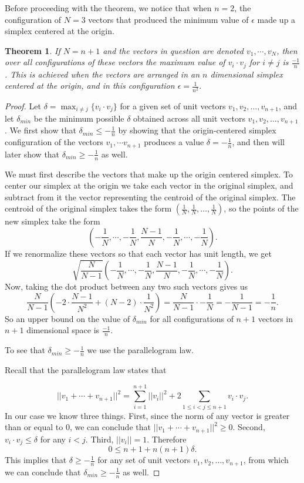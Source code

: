 \documentclass[11pt,letterpaper,twoside,english]{article}
\theoremstyle{theorem}
\newtheorem{theorem}{Theorem}[section]
\theoremstyle{remark}
\begin{document}
Before proceeding with the theorem, we notice that when $n=2$, the configuration of $N=3$ vectors that produced the minimum value of $\epsilon$ made up a simplex centered at the origin. 


\begin{theorem}
If $N=n+1$ and the vectors in question are denoted $v_1,\cdots, v_N$, then over all configurations of these vectors the maximum value of $v_i\cdot v_j$ for $i\neq j$ is $\frac{-1}{n}$. This is achieved when the vectors are arranged in an $n$ dimensional simplex centered at the origin, and in this configuration $\epsilon=\frac{1}{n^2}$.  
\end{theorem}

\begin{proof}
Let $\delta= \max_{i\neq j}\{v_i\cdot v_j\}$ for a given set of unit vectors $v_1, v_2, \ldots, v_{n+1}$, and let $\delta_{min}$ be the minimum possible $\delta$ obtained across all unit vectors $v_1, v_2, \ldots, v_{n+1}$. We first show that $\delta_{min} \le-\frac{1}{n}$ by showing that the origin-centered simplex configuration of the vectors $v_1,\cdots v_{n+1}$ produces a value $\delta=-\frac{1}{n}$, and then will later show that $\delta_{min} \geq -\frac{1}{n}$ as well. 

We must first describe the vectors that make up the origin centered simplex. To center our simplex at the origin we take each vector in the original simplex, and subtract from it the vector representing the centroid of the original simplex. The centroid of the original simplex takes the form $(\frac{1}{N},\frac{1}{N},\ldots,\frac{1}{N})$, so the points of the new simplex take the form
$$
\left(-\frac{1}{N},\cdots,-\frac{1}{N},\frac{N-1}{N},-\frac{1}{N},\cdots,-\frac{1}{N}\right).
$$
If we renormalize these vectors so that each vector has unit length, we get 
$$
\sqrt{\frac{N}{N-1}}\left(-\frac{1}{N},\cdots,-\frac{1}{N},\frac{N-1}{N},-\frac{1}{N},\cdots,-\frac{1}{N}\right).
$$
Now, taking the dot product between any two such vectors gives us
$$
\frac{N}{N-1}\left(-2\cdot\frac{N-1}{N^2}+(N-2)\cdot\frac{1}{N^2}\right)=\frac{N}{N-1}\cdot-\frac{1}{N}=-\frac{1}{N-1}=-\frac{1}{n}.
$$
So an upper bound on the value of $\delta_{min}$ for all configurations of $n+1$ vectors in $n+1$ dimensional space is $\frac{-1}{n}$. 

To see that $\delta_{min} \ge-\frac{1}{n}$ we use the parallelogram law.

Recall that the parallelogram law states that 

$$
||v_1+\cdots+v_{n+1}||^2=\displaystyle\sum_{i=1}^{n+1}||v_i||^2+2\displaystyle\sum_{1\le i<j\le n+1}v_i\cdot v_j.
$$
In our case we know three things. First, since the norm of any vector is greater than or equal to $0$, we can conclude that $||v_1 + \cdots + v_{n+1}||^2 \geq 0$. Second, $v_i\cdot v_j\le\delta$ for any $i<j$. Third, $||v_i||=1$. Therefore 
$$
0\le n+1+n(n+1)\delta.
$$
This implies that $\delta\ge -\frac{1}{n}$ for any set of unit vectors $v_1, v_2, \ldots, v_{n+1}$, from which we can conclude that $\delta_{min} \ge -\frac{1}{n}$ as well.


\end{proof}
\end{document}

